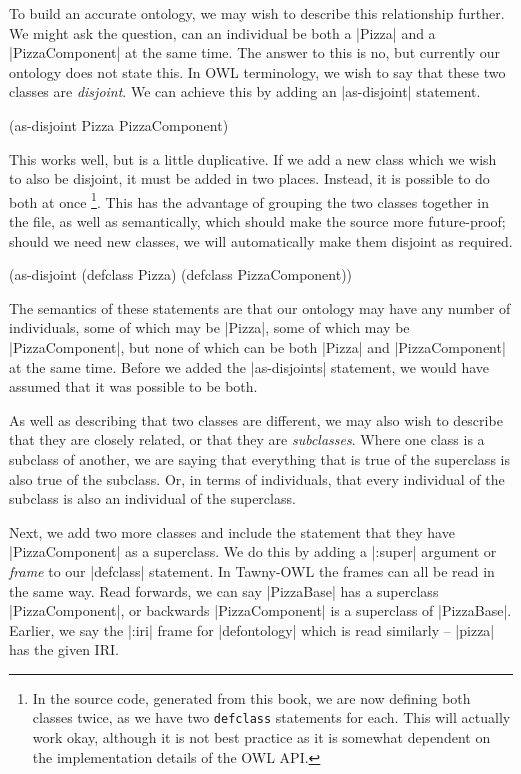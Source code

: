 To build an accurate ontology, we may wish to describe this relationship
further. We might ask the question, can an individual be both a |Pizza|
and a |PizzaComponent| at the same time. The answer to this is no, but
currently our ontology does not state this. In OWL terminology, we wish
to say that these two classes are \emph{disjoint}. We can achieve this by
adding an |as-disjoint| statement.

\begin{tawny}
(as-disjoint Pizza PizzaComponent)
\end{tawny}

This works well, but is a little duplicative. If we add a new class
which we wish to also be disjoint, it must be added in two places.
Instead, it is possible to do both at once \footnote{In the source code,
generated from this book, we are now defining both classes twice, as we
have two \lstinline|defclass| statements for each. This will actually work okay,
although it is not best practice as it is somewhat dependent on the
implementation details of the OWL API.}. This has the advantage of
grouping the two classes together in the file, as well as semantically,
which should make the source more future-proof; should we need new
classes, we will automatically make them disjoint as required.

\begin{tawny}
(as-disjoint
 (defclass Pizza)
 (defclass PizzaComponent))
\end{tawny}

The semantics of these statements are that our ontology may have any
number of individuals, some of which may be |Pizza|, some of which may
be |PizzaComponent|, but none of which can be both |Pizza| and
|PizzaComponent| at the same time. Before we added the |as-disjoints|
statement, we would have assumed that it was possible to be both.

As well as describing that two classes are different, we may also wish
to describe that they are closely related, or that they are
\emph{subclasses}. Where one class is a subclass of another, we are saying
that everything that is true of the superclass is also true of the
subclass. Or, in terms of individuals, that every individual of the
subclass is also an individual of the superclass.

Next, we add two more classes and include the statement that they have
|PizzaComponent| as a superclass. We do this by adding a |:super|
argument or \emph{frame} to our |defclass| statement. In Tawny-OWL the frames
can all be read in the same way. Read forwards, we can say |PizzaBase|
has a superclass |PizzaComponent|, or backwards |PizzaComponent| is a
superclass of |PizzaBase|. Earlier, we say the |:iri| frame for
|defontology| which is read similarly -- |pizza| has the given IRI.

